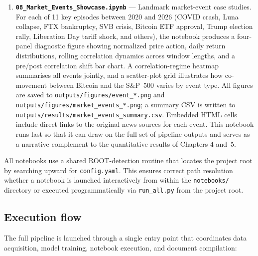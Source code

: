 \begin{enumerate}
    \item \textbf{\texttt{08\_Market\_Events\_Showcase.ipynb}} --- Landmark market-event case studies. For each of 11 key episodes between 2020 and 2026 (COVID crash, Luna collapse, FTX bankruptcy, SVB crisis, Bitcoin ETF approval, Trump election rally, Liberation Day tariff shock, and others), the notebook produces a four-panel diagnostic figure showing normalized price action, daily return distributions, rolling correlation dynamics across window lengths, and a pre/post correlation shift bar chart. A correlation-regime heatmap summarises all events jointly, and a scatter-plot grid illustrates how co-movement between Bitcoin and the S\&P~500 varies by event type. All figures are saved to \texttt{outputs/figures/event\_*.png} and \texttt{outputs/figures/market\_events\_*.png}; a summary CSV is written to \texttt{outputs/results/market\_events\_summary.csv}. Embedded HTML cells include direct links to the original news sources for each event. This notebook runs last so that it can draw on the full set of pipeline outputs and serves as a narrative complement to the quantitative results of Chapters 4 and~5.
\end{enumerate}

All notebooks use a shared ROOT-detection routine that locates the project root by searching upward for \texttt{config.yaml}. This ensures correct path resolution whether a notebook is launched interactively from within the \texttt{notebooks/} directory or executed programmatically via \texttt{run\_all.py} from the project root.

\subsection{Execution flow}

The full pipeline is launched through a single entry point that coordinates data acquisition, model training, notebook execution, and document compilation:

